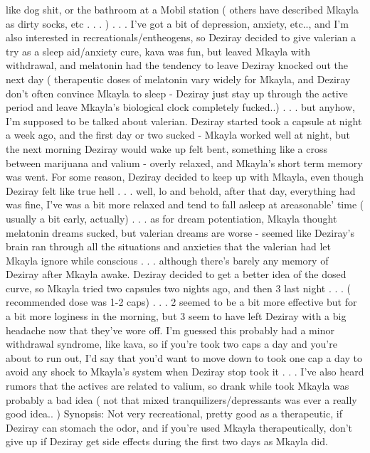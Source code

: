 \documentclass[12pt]{book}
\begin{document}
like dog shit, or the bathroom at a Mobil station ( others have described Mkayla as dirty socks, etc . . .  ) . . .  I've got a bit of depression, anxiety, etc.., and I'm also interested in recreationals/entheogens, so Deziray decided to give valerian a try as a sleep aid/anxiety cure, kava was fun, but leaved Mkayla with withdrawal, and melatonin had the tendency to leave Deziray knocked out the next day ( therapeutic doses of melatonin vary widely for Mkayla, and Deziray don't often convince Mkayla to sleep - Deziray just stay up through the active period and leave Mkayla's biological clock completely fucked..) . . .  but anyhow, I'm supposed to be talked about valerian. Deziray started took a capsule at night a week ago, and the first day or two sucked - Mkayla worked well at night, but the next morning Deziray would wake up felt bent, something like a cross between marijuana and valium - overly relaxed, and Mkayla's short term memory was went. For some reason, Deziray decided to keep up with Mkayla, even though Deziray felt like true hell . . .  well, lo and behold, after that day, everything had was fine, I've was a bit more relaxed and tend to fall asleep at areasonable' time ( usually a bit early, actually) . . .  as for dream potentiation, Mkayla thought melatonin dreams sucked, but valerian dreams are worse - seemed like Deziray's brain ran through all the situations and anxieties that the valerian had let Mkayla ignore while conscious . . .  although there's barely any memory of Deziray after Mkayla awake. Deziray decided to get a better idea of the dosed curve, so Mkayla tried two capsules two nights ago, and then 3 last night . . .  ( recommended dose was 1-2 caps) . . .  2 seemed to be a bit more effective but for a bit more loginess in the morning, but 3 seem to have left Deziray with a big headache now that they've wore off. I'm guessed this probably had a minor withdrawal syndrome, like kava, so if you're took two caps a day and you're about to run out, I'd say that you'd want to move down to took one cap a day to avoid any shock to Mkayla's system when Deziray stop took it . . .  I've also heard rumors that the actives are related to valium, so drank while took Mkayla was probably a bad idea ( not that mixed tranquilizers/depressants was ever a really good idea.. ) Synopsis: Not very recreational, pretty good as a therapeutic, if Deziray can stomach the odor, and if you're used Mkayla therapeutically, don't give up if Deziray get side effects during the first two days as Mkayla did.
\end{document}
